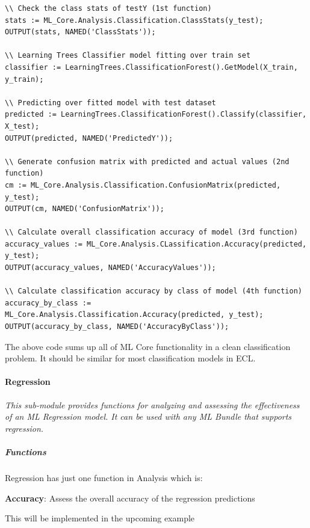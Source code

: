 \documentclass[a4paper,oneside,12pt]{book}
\begin{document}
\begin{lstlisting}
\\ Check the class stats of testY (1st function)
stats := ML_Core.Analysis.Classification.ClassStats(y_test);
OUTPUT(stats, NAMED('ClassStats'));

\\ Learning Trees Classifier model fitting over train set
classifier := LearningTrees.ClassificationForest().GetModel(X_train, y_train);

\\ Predicting over fitted model with test dataset
predicted := LearningTrees.ClassificationForest().Classify(classifier, X_test);
OUTPUT(predicted, NAMED('PredictedY'));

\\ Generate confusion matrix with predicted and actual values (2nd function)
cm := ML_Core.Analysis.Classification.ConfusionMatrix(predicted, y_test);
OUTPUT(cm, NAMED('ConfusionMatrix'));

\\ Calculate overall classification accuracy of model (3rd function)
accuracy_values := ML_Core.Analysis.CLassification.Accuracy(predicted, y_test);
OUTPUT(accuracy_values, NAMED('AccuracyValues'));

\\ Calculate classification accuracy by class of model (4th function)
accuracy_by_class := ML_Core.Analysis.Classification.Accuracy(predicted, y_test);
OUTPUT(accuracy_by_class, NAMED('AccuracyByClass'));
\end{lstlisting}

The above code sums up all of ML Core functionality in a clean classification problem. It should be similar for most classification models in ECL.

\paragraph{Regression}\label{analysis:regression}

\textit{This sub-module provides functions for analyzing and assessing the effectiveness of an ML Regression model. It can be used with any ML Bundle that supports regression.}

\subparagraph{Functions}

Regression has just one function in Analysis which is:

\textbf{Accuracy}: Assess the overall accuracy of the regression predictions

This will be implemented in the upcoming example
\end{document}
